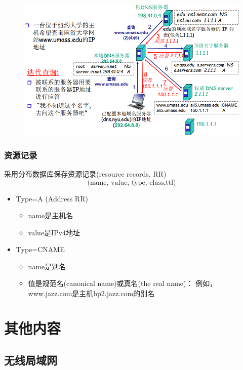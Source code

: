 \begin{figure}[H]
    \centering
    \includegraphics[width=0.8\linewidth]{fig/dns-example.png}
\end{figure}

\subsubsection{资源记录}
采用分布数据库保存资源记录(resource records, RR)
\[\text{(name, value, type, class,ttl)}\]
\begin{itemize}
\item Type=A (Address RR)
\begin{itemize}
\item name是主机名
\item value是IPv4地址
\end{itemize}
\item Type=CNAME
\begin{itemize}
\item name是别名
\item 值是规范名(canonical name)或真名(the real name)：
例如， www.jazz.com是主机bp2.jazz.com的别名
\end{itemize}
\end{itemize}

\section{其他内容}
\subsection{无线局域网}

